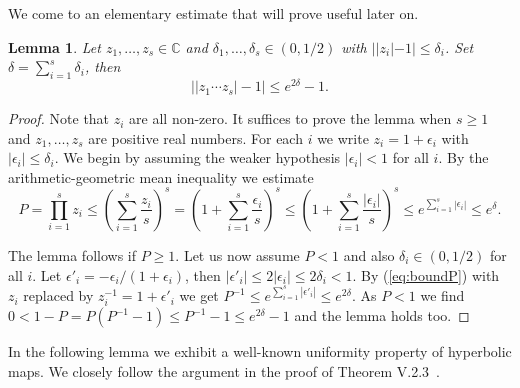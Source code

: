 \documentclass[12pt,oneside,a4]{amsart}
\newcommand{\IC}{\mathbb{C}}
\newcounter{maincounter}
\numberwithin{maincounter}{section}
\numberwithin{equation}{section}
\newtheorem{lemma}[maincounter]{Lemma}
\begin{document}
We come to an elementary estimate that will prove useful later on. 
\begin{lemma}
  \label{lem:elementary}
  Let $z_1,\ldots,z_s\in\IC$ and $\delta_1,\ldots,\delta_s \in (0,1/2)$
  with $||z_i|-1|\le \delta_i$. Set
  $\delta=\sum_{i=1}^s\delta_i$, then 
  \begin{equation*}
    \bigl||z_1\cdots z_s|-1\bigr| \le e^{2\delta}-1.
  \end{equation*}  
\end{lemma}
\begin{proof}
  Note that $z_i$ are all non-zero.
  It suffices to prove the lemma when $s\ge 1$ and
  $z_1,\ldots,z_s$ are positive real numbers.
  For each $i$ we write $z_i = 1+\epsilon_i$ with
  $|\epsilon_i|\le\delta_i$. We begin by assuming the weaker
  hypothesis $|\epsilon_i|<1$ for all $i$. 
  By the arithmetic-geometric mean inequality we estimate
  \begin{equation}
  \label{eq:boundP}
  P=\prod_{i=1}^s z_i\le \left(\sum_{i=1}^s \frac{z_i}{s}\right)^s
  =\left(1+\sum_{i=1}^s \frac{\epsilon_i}{s}\right)^s\le
  \left(1+\sum_{i=1}^s \frac{|\epsilon_i|}{s}\right)^s
  \le
  e^{\sum_{i=1}^s|\epsilon_i|}  
   \le   e^{\delta}.
  \end{equation}

  The lemma follows if $P\ge 1$.
  Let us now assume $P<1$ and also $\delta_i \in (0,1/2)$ for all $i$.
  Let $\epsilon'_i =
  -\epsilon_i/(1+\epsilon_i)$, then $|\epsilon'_i|\le 2|\epsilon_i|\le
  2\delta_i<1$.
  By (\ref{eq:boundP}) with $z_i$ replaced by 
  $z_i^{-1} = 1+\epsilon'_i$ we get $P^{-1}\le
  e^{\sum_{i=1}^s|\epsilon'_i|}\le e^{2\delta}$.  As $P<1$ we find $0<1-P = P(P^{-1}-1)\le
  P^{-1}-1\le e^{2\delta}-1$ and the lemma holds too.    
\end{proof}

In the following lemma we exhibit a well-known uniformity property of
hyperbolic maps. We closely follow the argument in the proof of
Theorem V.2.3~\cite{CarlesonGamelin}. 
\end{document}
